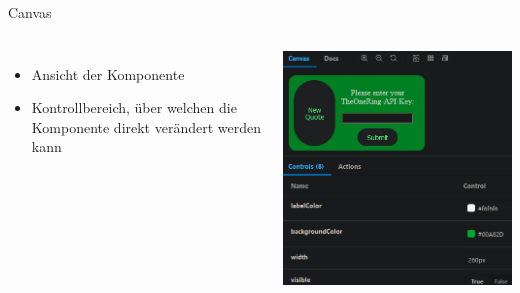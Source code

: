 \documentclass{beamer}
\begin{document}
\begin{frame}{Canvas}
	\begin{columns}
		\begin{itemize}
			\item Ansicht der Komponente
			\item Kontrollbereich, über welchen die Komponente direkt verändert werden kann
		\end{itemize}
		
		\includegraphics[width=\linewidth]{Images/web-ui/canvas.png}
	\end{columns}
\end{frame}
\end{document}
